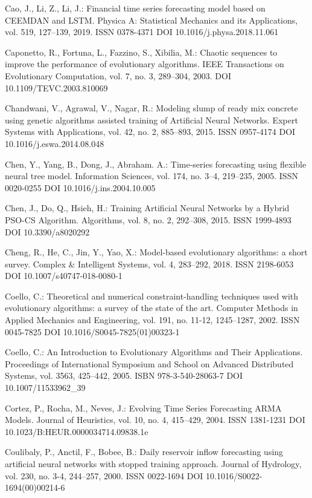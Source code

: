 \begin{thebibliography}{99.}
 Cao, J., Li, Z., Li, J.: Financial time series forecasting model based on CEEMDAN and LSTM. Physica A: Statistical Mechanics and its Applications, vol. 519, 127--139, 2019. ISSN 0378-4371 DOI 10.1016/j.physa.2018.11.061

 Caponetto, R., Fortuna, L., Fazzino, S., Xibilia, M.: Chaotic sequences to improve the performance of evolutionary algorithms. IEEE Transactions on Evolutionary Computation, vol. 7, no. 3, 289--304, 2003. DOI 10.1109/TEVC.2003.810069

 Chandwani, V., Agrawal, V., Nagar, R.: Modeling slump of ready mix concrete using genetic algorithms assisted training of Artificial Neural Networks. Expert Systems with Applications, vol. 42, no. 2, 885--893, 2015. ISSN 0957-4174 DOI 10.1016/j.eswa.2014.08.048

 Chen, Y., Yang, B., Dong, J., Abraham. A.: Time-series forecasting using flexible neural tree model. Information Sciences, vol. 174, no. 3--4, 219--235, 2005. ISSN 0020-0255 DOI 10.1016/j.ins.2004.10.005

 Chen, J., Do, Q., Hsieh, H.: Training Artificial Neural Networks by a Hybrid PSO-CS Algorithm. Algorithms, vol. 8, no. 2, 292--308, 2015. ISSN 1999-4893 DOI 10.3390/a8020292

 Cheng, R., He, C., Jin, Y., Yao, X.: Model-based evolutionary algorithms: a short survey. Complex \& Intelligent Systems, vol. 4, 283--292, 2018. ISSN 2198-6053 DOI 10.1007/s40747-018-0080-1

 Coello, C.: Theoretical and numerical constraint-handling techniques used with evolutionary algorithms: a survey of the state of the art. Computer Methods in Applied Mechanics and Engineering, vol. 191, no. 11-12, 1245--1287, 2002. ISSN 0045-7825 DOI 10.1016/S0045-7825(01)00323-1

 Coello, C.: An Introduction to Evolutionary Algorithms and Their Applications. Proceedings of International Symposium and School on Advanced Distributed Systems, vol. 3563, 425--442, 2005. ISBN 978-3-540-28063-7 DOI 10.1007/11533962\_39

 Cortez, P., Rocha, M., Neves, J.: Evolving Time Series Forecasting ARMA Models. Journal of Heuristics, vol. 10, no. 4, 415--429, 2004. ISSN 1381-1231 DOI 10.1023/B:HEUR.0000034714.09838.1e

 Coulibaly, P., Anctil, F., Bobee, B.: Daily reservoir inflow forecasting using artificial neural networks with stopped training approach. Journal of Hydrology, vol. 230, no. 3-4, 244--257, 2000. ISSN 0022-1694 DOI 10.1016/S0022-1694(00)00214-6


\end{thebibliography}
